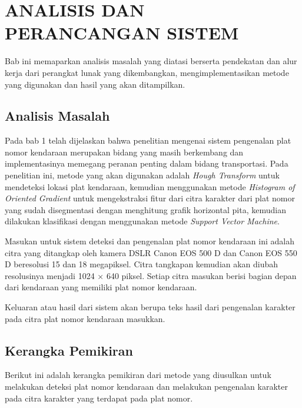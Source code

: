 \chapter{ANALISIS DAN PERANCANGAN SISTEM}

%
\vspace{4.5pt}

\noindent Bab ini memaparkan analisis masalah yang diatasi berserta pendekatan dan alur kerja dari perangkat lunak yang dikembangkan, mengimplementasikan metode yang digunakan dan hasil yang akan ditampilkan.
\\
\section{Analisis Masalah}
\noindent Pada bab 1 telah dijelaskan bahwa penelitian mengenai sistem pengenalan plat nomor kendaraan merupakan bidang yang masih berkembang dan implementasinya memegang peranan penting dalam bidang transportasi. Pada penelitian ini, metode yang akan digunakan adalah \textit{Hough Transform} untuk mendeteksi lokasi plat kendaraan, kemudian menggunakan metode \textit{Histogram of Oriented Gradient} untuk mengekstraksi fitur dari citra karakter dari plat nomor yang sudah disegmentasi dengan menghitung grafik horizontal pita, kemudian dilakukan klasifikasi dengan menggunakan metode \textit{Support Vector Machine}.

\noindent Masukan untuk sistem deteksi dan pengenalan plat nomor kendaraan ini adalah citra yang ditangkap oleh kamera DSLR Canon EOS 500 D dan Canon EOS 550 D beresolusi 15 dan 18 megapiksel. Citra tangkapan kemudian akan diubah resolusinya menjadi 1024 $\times$ 640 piksel. Setiap citra masukan berisi bagian depan dari kendaraan yang memiliki plat nomor kendaraan.

\noindent Keluaran atau hasil dari sistem akan berupa teks hasil dari pengenalan karakter pada citra plat nomor kendaraan masukkan.\\ 

\section{Kerangka Pemikiran}
\noindent Berikut ini adalah kerangka pemikiran dari metode yang diusulkan untuk melakukan deteksi plat nomor kendaraan dan melakukan pengenalan karakter pada citra karakter yang terdapat pada plat nomor.\\

